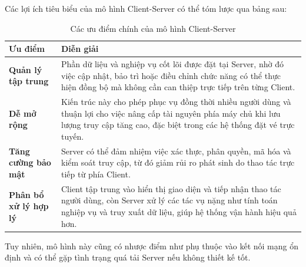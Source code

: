 \indent \indent Các lợi ích tiêu biểu của mô hình Client-Server có thể tóm lược qua bảng sau:
\renewcommand{\arraystretch}{1.3}
\setlength{\tabcolsep}{6pt}
\setlength{\LTleft}{0pt}
\setlength{\LTright}{0pt}
\begin{longtable}{|p{}|p{}|}
    \caption{Các ưu điểm chính của mô hình Client-Server}
    \label{tab:client_server_advantages}\\
    \hline
    \textbf{Ưu điểm} & \textbf{Diễn giải} \\ \hline
    \textbf{Quản lý tập trung} & Phần dữ liệu và nghiệp vụ cốt lõi được đặt tại Server, nhờ đó việc cập nhật, bảo trì hoặc điều chỉnh chức năng có thể thực hiện đồng bộ mà không cần can thiệp trực tiếp trên từng Client. \\ \hline
    \textbf{Dễ mở rộng} & Kiến trúc này cho phép phục vụ đồng thời nhiều người dùng và thuận lợi cho việc nâng cấp tài nguyên phía máy chủ khi lưu lượng truy cập tăng cao, đặc biệt trong các hệ thống đặt vé trực tuyến. \\ \hline
    \textbf{Tăng cường bảo mật} & Server có thể đảm nhiệm việc xác thực, phân quyền, mã hóa và kiểm soát truy cập, từ đó giảm rủi ro phát sinh do thao tác trực tiếp từ phía Client. \\ \hline
    \textbf{Phân bổ xử lý hợp lý} & Client tập trung vào hiển thị giao diện và tiếp nhận thao tác người dùng, còn Server xử lý các tác vụ nặng như tính toán nghiệp vụ và truy xuất dữ liệu, giúp hệ thống vận hành hiệu quả hơn. \\ \hline
\end{longtable}
\indent \indent Tuy nhiên, mô hình này cũng có nhược điểm như phụ thuộc vào kết nối mạng ổn định và có thể gặp tình trạng quá tải Server nếu không thiết kế tốt.

